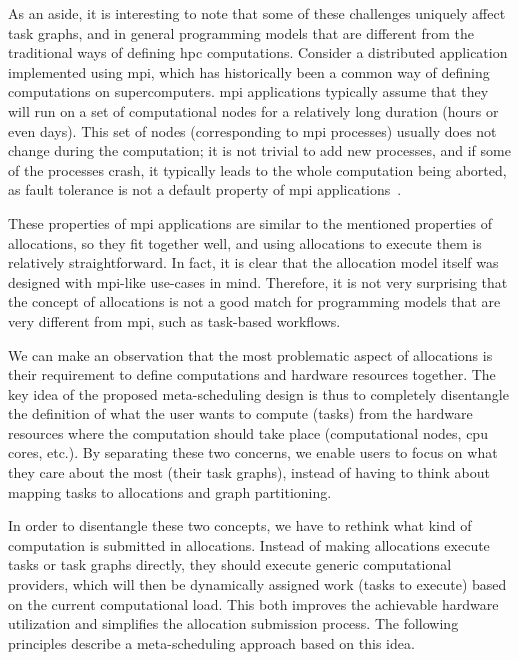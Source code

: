 As an aside, it is interesting to note that some of these challenges uniquely affect task graphs,
and in general programming models that are different from the traditional ways of defining
\gls{hpc} computations. Consider a distributed application implemented using
\gls{mpi}, which has historically been a common way of defining computations on
supercomputers. \gls{mpi} applications typically assume that they will run on a set
of computational nodes for a relatively long duration (hours or even days). This set of nodes
(corresponding to \gls{mpi} processes) usually does not change during the
computation; it is not trivial to add new processes, and if some of the processes crash, it
typically leads to the whole computation being aborted, as fault tolerance is not a default
property of \gls{mpi} applications~\cite{fault_tolerant_mpi}.

These properties of \gls{mpi} applications are similar to the mentioned properties of
allocations, so they fit together well, and using allocations to execute them is relatively
straightforward. In fact, it is clear that the allocation model itself was designed with
\gls{mpi}-like use-cases in mind. Therefore, it is not very surprising that the
concept of allocations is not a good match for programming models that are very different from
\gls{mpi}, such as task-based workflows.

We can make an observation that the most problematic aspect of allocations is their requirement to
define computations and hardware resources together. The key idea of the proposed meta-scheduling
design is thus to completely disentangle the definition of what the user wants to compute (tasks)
from the hardware resources where the computation should take place (computational nodes,
\gls{cpu} cores, etc.). By separating these two concerns, we enable users to focus on
what they care about the most (their task graphs), instead of having to think about mapping tasks
to allocations and graph partitioning.

In order to disentangle these two concepts, we have to rethink what kind of computation is
submitted in allocations. Instead of making allocations execute tasks or task graphs directly, they
should execute generic computational providers, which will then be dynamically assigned work (tasks
to execute) based on the current computational load. This both improves the achievable hardware
utilization and simplifies the allocation submission process. The following principles describe a
meta-scheduling approach based on this idea.

